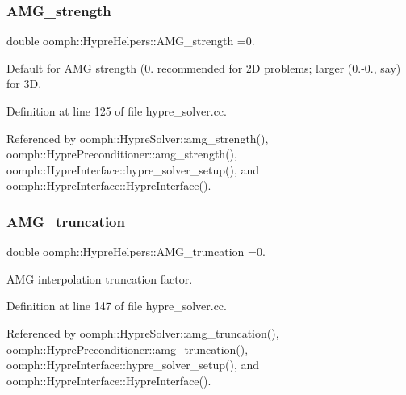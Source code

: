 \subsubsection{\texorpdfstring{A\+M\+G\+\_\+strength}{AMG\_strength}}
{\footnotesize\ttfamily double oomph\+::\+Hypre\+Helpers\+::\+A\+M\+G\+\_\+strength =0.}



Default for A\+MG strength (0. recommended for 2D problems; larger (0.-\/0., say) for 3D. 



Definition at line 125 of file hypre\+\_\+solver.\+cc.



Referenced by oomph\+::\+Hypre\+Solver\+::amg\+\_\+strength(), oomph\+::\+Hypre\+Preconditioner\+::amg\+\_\+strength(), oomph\+::\+Hypre\+Interface\+::hypre\+\_\+solver\+\_\+setup(), and oomph\+::\+Hypre\+Interface\+::\+Hypre\+Interface().

\mbox{\label{namespaceoomph_1_1HypreHelpers_aa32196f0215efa229ced79ce65e3887d}} 
\subsubsection{\texorpdfstring{A\+M\+G\+\_\+truncation}{AMG\_truncation}}
{\footnotesize\ttfamily double oomph\+::\+Hypre\+Helpers\+::\+A\+M\+G\+\_\+truncation =0.}



A\+MG interpolation truncation factor. 



Definition at line 147 of file hypre\+\_\+solver.\+cc.



Referenced by oomph\+::\+Hypre\+Solver\+::amg\+\_\+truncation(), oomph\+::\+Hypre\+Preconditioner\+::amg\+\_\+truncation(), oomph\+::\+Hypre\+Interface\+::hypre\+\_\+solver\+\_\+setup(), and oomph\+::\+Hypre\+Interface\+::\+Hypre\+Interface().

